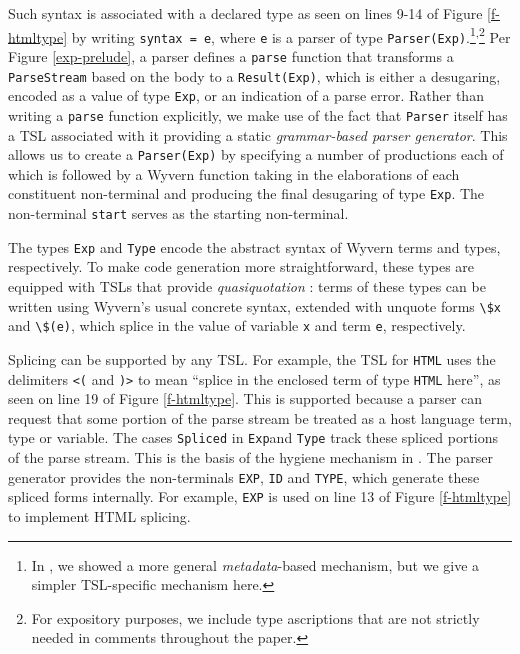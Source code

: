 \documentclass{sig-alternate}[10pt]
\newcommand{\lstinlinew}[1]{\lstinline[style=wyvern]{#1}}
\begin{document}
Such syntax is associated with a declared type as seen on lines 9-14 of Figure \ref{f-htmltype} by writing \lstinline[style=wyvern]{syntax = e}, where \lstinlinew{e} is a parser of type \lstinlinew{Parser(Exp)}.\footnote{\scriptsize In \cite{TSLs}, we showed a more general \emph{metadata}-based mechanism, but we give a simpler TSL-specific mechanism here.}\textsuperscript{,}\footnote{\scriptsize For expository purposes, we include type ascriptions that are not strictly needed in comments throughout the paper.} Per  Figure \ref{exp-prelude}, a parser defines a \lstinlinew{parse} function that transforms a \lstinlinew{ParseStream} based on the body to a \lstinlinew{Result(Exp)}, which is either a desugaring, encoded as a value of type \lstinlinew{Exp}, or an indication of a parse error. Rather than writing a \lstinlinew{parse} function explicitly, we make use of the fact that \lstinlinew{Parser} itself has a TSL associated with it providing a static \emph{grammar-based parser generator}. This allows us to create a \lstinlinew{Parser(Exp)} by specifying a number of productions each of which is followed by a Wyvern function taking in the elaborations of each constituent non-terminal and producing the final desugaring of type \lstinlinew{Exp}. The non-terminal \lstinlinew{start} serves as the starting non-terminal. 

The types \lstinlinew{Exp} and \lstinline{Type} encode the abstract syntax of Wyvern terms and types, respectively. To make code generation more straightforward, these types are equipped with TSLs that provide \emph{quasiquotation}  \cite{quine40book,Bawd99a,ScalaMacros2013}: terms of these types  can be written using Wyvern's usual concrete syntax, extended with unquote forms \lstinlinew{\$x} and \lstinlinew{\$(e)}, which splice in the value of  variable \lstinlinew{x} and  term \lstinlinew{e}, respectively. %


Splicing can be supported by any TSL. For example, the TSL for \lstinlinew{HTML} uses the delimiters \lstinlinew{<(} and \lstinlinew{)>} to mean ``splice in the enclosed term  of type \lstinlinew{HTML} here'', as seen on line 19 of Figure \ref{f-htmltype}. This is supported because a parser can request that some portion of the parse stream be treated as a host language term, type or variable. The cases \lstinlinew{Spliced} in \lstinlinew{Exp}and \lstinlinew{Type} track these spliced portions of the parse stream. This is the basis of the hygiene mechanism in \cite{TSLs}. The parser generator provides the non-terminals \lstinlinew{EXP}, \lstinlinew{ID} and \lstinlinew{TYPE}, which generate these spliced forms internally. For example, \lstinlinew{EXP} is used on line 13 of Figure \ref{f-htmltype} to implement HTML splicing.%
\end{document}
